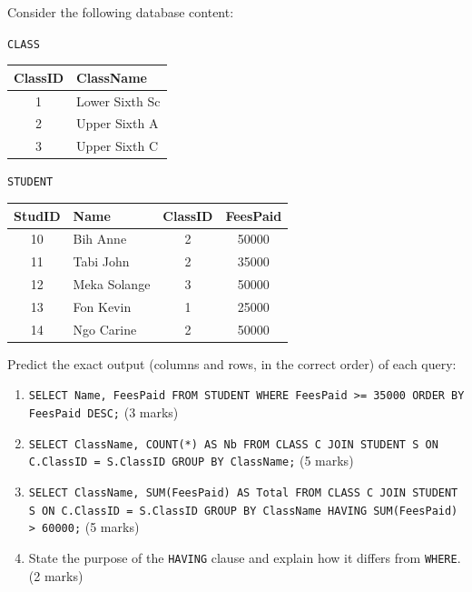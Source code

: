 \documentclass[11pt]{article}
\begin{document}
\begin{exercice}
Consider the following database content:

\texttt{CLASS}
\begin{center}
\begin{tabular}{|c|l|}
\hline
\rowcolor{popblueL} \textbf{ClassID} & \textbf{ClassName} \\
\hline
1 & Lower Sixth Sc \\
\hline
2 & Upper Sixth A \\
\hline
3 & Upper Sixth C \\
\hline
\end{tabular}
\end{center}

\texttt{STUDENT}
\begin{center}
\begin{tabular}{|c|l|c|c|}
\hline
\rowcolor{popblueL} \textbf{StudID} & \textbf{Name} & \textbf{ClassID} & \textbf{FeesPaid} \\
\hline
10 & Bih Anne & 2 & 50000 \\
\hline
11 & Tabi John & 2 & 35000 \\
\hline
12 & Meka Solange & 3 & 50000 \\
\hline
13 & Fon Kevin & 1 & 25000 \\
\hline
14 & Ngo Carine & 2 & 50000 \\
\hline
\end{tabular}
\end{center}

Predict the exact output (columns and rows, in the correct order) of each query:
\begin{enumerate}
\item \texttt{SELECT Name, FeesPaid FROM STUDENT WHERE FeesPaid >= 35000 ORDER BY FeesPaid DESC;} \hfill (3 marks)
\item \texttt{SELECT ClassName, COUNT(*) AS Nb FROM CLASS C JOIN STUDENT S ON C.ClassID = S.ClassID GROUP BY ClassName;} \hfill (5 marks)
\item \texttt{SELECT ClassName, SUM(FeesPaid) AS Total FROM CLASS C JOIN STUDENT S ON C.ClassID = S.ClassID GROUP BY ClassName HAVING SUM(FeesPaid) > 60000;} \hfill (5 marks)
\item State the purpose of the \texttt{HAVING} clause and explain how it differs from \texttt{WHERE}. \hfill (2 marks)
\end{enumerate}
\end{exercice}
\end{document}
